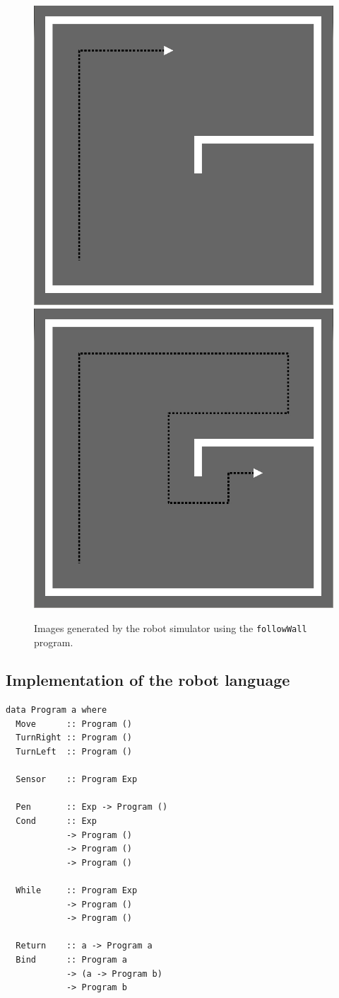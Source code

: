 \begin{figure}
\includegraphics[width=.49\linewidth]{./wall1}
\includegraphics[width=.49\linewidth]{./wall2}
\caption{Images generated by the robot simulator using the {\tt followWall} program.}
\label{fig:followwall}
\end{figure}



\FloatBarrier
\subsection{Implementation of the robot language}

\begin{small}
\begin{verbatim} 
data Program a where
  Move      :: Program ()
  TurnRight :: Program ()
  TurnLeft  :: Program ()

  Sensor    :: Program Exp

  Pen       :: Exp -> Program () 
  Cond      :: Exp 
            -> Program () 
            -> Program () 
            -> Program () 

  While     :: Program Exp 
            -> Program () 
            -> Program ()
   
  Return    :: a -> Program a 
  Bind      :: Program a 
            -> (a -> Program b) 
            -> Program b

\end{verbatim}
\end{small}

